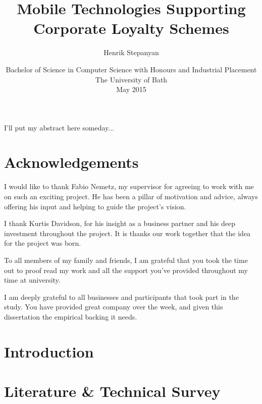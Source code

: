 \documentclass[11pt,openright,a4paper]{report}
\title{Mobile Technologies Supporting Corporate Loyalty Schemes}
\author{Henrik Stepanyan}
\date{Bachelor of Science in Computer Science with Honours and Industrial
Placement\\The University of Bath\\May 2015}
\begin{document}
\lstset{language=Java,breaklines,breakatwhitespace,basicstyle=\small}


\setcounter{page}{0}


\maketitle
\newpage


\newpage


\newpage


\abstract
I'll put my abstract here someday...
\newpage


\tableofcontents
\listoffigures
\newpage

\chapter*{Acknowledgements}
I would like to thank Fabio Nemetz, my supervisor for agreeing to work with me
on such an exciting project. He has been a pillar of motivation and advice,
always offering his input and helping to guide the project's vision.

I thank Kurtis Davidson, for his insight as a business partner and his deep
investment throughout the project. It is thanks our work together that the idea
for the project was born.

To all members of my family and friends, I am grateful that you took the time 
out to proof read my work and all the support you've provided throughout
my time at university.

I am deeply grateful to all businesses and participants that took part in
the study. You have provided great company over the week, and given this
dissertation the empirical backing it needs.

\newpage


\setcounter{page}{1}



\chapter{Introduction}
%

\chapter{Literature \& Technical Survey}
%
\end{document}
